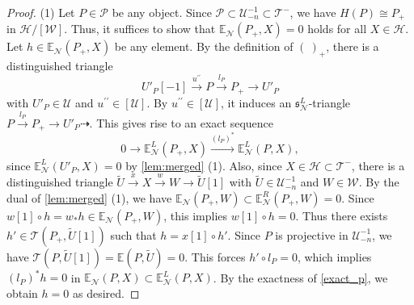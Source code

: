 \documentclass[a4paper,reqno,10pt]{amsart}
\theoremstyle{definition}
\theoremstyle{definition}
\theoremstyle{definition}
\theoremstyle{definition}
\theoremstyle{plain}
\newcommand{\fs}{\mathfrak{s}}
\newcommand{\BE}{\mathbb{E}}
\newcommand{\CH}{\mathcal{H}}
\newcommand{\CN}{\mathcal{N}}
\newcommand{\CP}{\mathcal{P}}
\newcommand{\CT}{\mathcal{T}}
\newcommand{\CU}{\mathcal{U}}
\newcommand{\CW}{\mathcal{W}}
\begin{document}
\begin{proof}
{\rm (1)} Let $P\in\CP$ be any object. Since $\CP\subset\CU_{-n}^{-1}\subset\CT^-$, we have $H(P)\cong P_+$ in $\CH/[\CW]$.
Thus, it suffices to show %
that 
$\BE_{\CN}(P_+,X)=0$
holds for all $X\in\CH$. 
Let $h\in\BE_{\CN}(P_+,X)$ be any element. 
By the definition of $(\ )_+$, there is a distinguished triangle
\[
U'_P[-1]\xrightarrow{u^{\prime\prime}}P\xrightarrow{l_P}P_+\to U'_P
\]
with $U'_P\in\CU$ and $u^{\prime\prime}\in[\CU]$.
By $u^{\prime\prime}\in[\CU]$, %
it induces an $\fs_{\CN}^L$-triangle
$P\xrightarrow{l_P}P_+\to U'_P\dashrightarrow$.
This gives rise to an exact sequence
\begin{equation}\label{exact_p}
0\to\BE_{\CN}^L(P_+,X)\xrightarrow{(l_P)^{\ast}}\BE_{\CN}^L(P,X),
\end{equation}
since $\BE_{\CN}^L(U'_P,X)=0$ by \cref{lem:merged} {\rm (1)}. 
Also, since $X\in\CH\subset \CT^-$, there is a distinguished triangle 
$\widetilde U\xrightarrow{x}X\xrightarrow{w}W\to \widetilde{U}[1]$
with $\widetilde{U}\in\CU_{-n}^{-1}$ and $W\in\CW$.
By the dual of \cref{lem:merged} {\rm (1)}, we have $\BE_{\CN}(P_+,W)\subset\BE_{\CN}^R(P_+,W)=0$.
Since $w[1]\circ h=w_{\ast}h\in\BE_{\CN}(P_+,W)$, this implies $w[1]\circ h=0$. Thus there exists $h'\in\CT(P_+,\widetilde{U}[1])$ such that $h=x[1]\circ h'$.  
Since $P$ is projective in $\CU_{-n}^{-1}$, we have $\CT(P,\widetilde{U}[1])=\BE(P,\widetilde{U})=0$. This forces $h'\circ l_P=0$, which implies $(l_P)^{\ast}h=0$ in $\BE_{\CN}(P,X)\subset\BE_{\CN}^L(P,X)$. By the exactness of \eqref{exact_p}, we obtain $h=0$ as desired. 


\end{proof}
\end{document}
